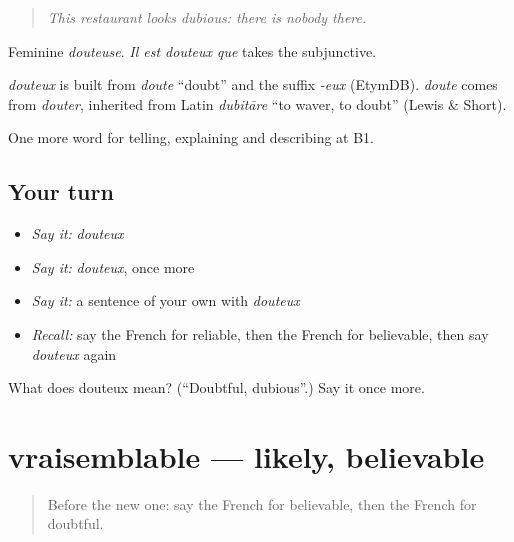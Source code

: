 \begin{quote}
\emph{This restaurant looks dubious: there is nobody there.}
\end{quote}

Feminine \emph{douteuse}. \emph{Il est douteux que} takes the subjunctive.

\begin{cousinweb}
\emph{douteux} is built from \emph{doute} \textquotedblleft{}doubt\textquotedblright{} and the suffix \emph{-eux} (EtymDB). \emph{doute} comes from \emph{douter}, inherited from Latin \emph{dubitāre} \textquotedblleft{}to waver, to doubt\textquotedblright{} (Lewis \& Short).
\end{cousinweb}

\begin{grammarlens}[title={What you've built}]
One more word for telling, explaining and describing at B1.
\end{grammarlens}

\subsection*{Your turn}
\begin{itemize}
\raggedright
  \item \emph{Say it:} \emph{douteux}
  \item \emph{Say it:} \emph{douteux}, once more
  \item \emph{Say it:} a sentence of your own with \emph{douteux}
  \item \emph{Recall:} say the French for reliable, then the French for believable, then say \emph{douteux} again
\end{itemize}

\begin{tcolorbox}[breakable,colback=teal!4,colframe=teal!35!black,title={Before you move on}]
What does douteux mean? (\textquotedblleft{}Doubtful, dubious\textquotedblright{}.) Say it once more.
\end{tcolorbox}
\section[vraisemblable]{vraisemblable — likely, believable}

\label{lesson:FR-C340-vraisemblable}



\begin{quote}
Before the new one: say the French for believable, then the French for doubtful.
\end{quote}

